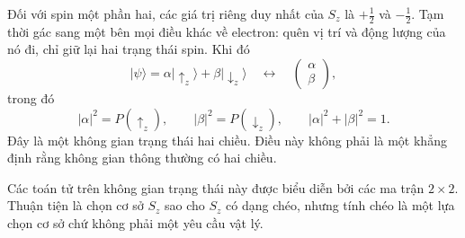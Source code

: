 Đối với spin một phần hai, các giá trị riêng duy nhất của \(S_z\) là \(+\tfrac12\) và \(-\tfrac12\). Tạm thời gác sang một bên mọi điều khác về electron: quên vị trí và động lượng của nó đi, chỉ giữ lại hai trạng thái spin. Khi đó
\begin{equation}
|\psi\rangle
=
\alpha|\uparrow_z\rangle+\beta|\downarrow_z\rangle
\quad\longleftrightarrow\quad
\begin{pmatrix}
\alpha\\
\beta
\end{pmatrix},
\end{equation}
trong đó
\begin{equation}
|\alpha|^2=P(\uparrow_z),
\qquad
|\beta|^2=P(\downarrow_z),
\qquad
|\alpha|^2+|\beta|^2=1.
\end{equation}
Đây là một không gian trạng thái hai chiều. Điều này không phải là một khẳng định rằng không gian thông thường có hai chiều.

\begin{classroomqa}
\end{classroomqa}

Các toán tử trên không gian trạng thái này được biểu diễn bởi các ma trận \(2\times2\). Thuận tiện là chọn cơ sở \(S_z\) sao cho \(S_z\) có dạng chéo, nhưng tính chéo là một lựa chọn cơ sở chứ không phải một yêu cầu vật lý.

\begin{classroomqa}
\end{classroomqa}

\begin{classroomqa}
\end{classroomqa}

